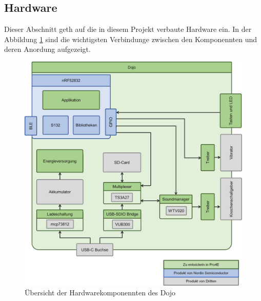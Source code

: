 \documentclass[10pt,a4paper,oneside]{99_fhnwreport}
\begin{document}
\newpage

\subsection{Hardware} \label{sec:hardware}

Dieser Abschnitt geth auf die in diesem Projekt verbaute Hardware ein. In der Abbildung \ref{fig:dojo} sind die wichtigsten Verbindunge zwischen den Komponennten und deren Anordung aufgezeigt.

\begin{figure}[htb]
\includegraphics[width=\textwidth]{Dojo.png}
\caption{Übersicht der Hardwarekomponennten des Dojo} %
\label{fig:dojo}
\end{figure}
\end{document}

